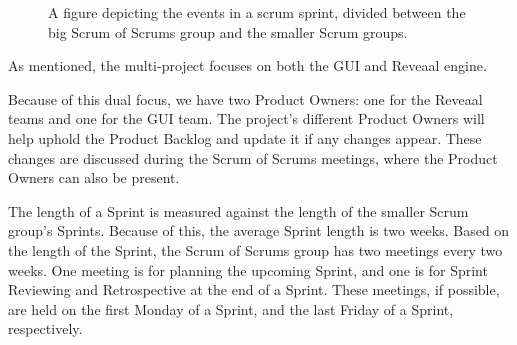 \begin{figure}[H]
    \centering
    \caption{A figure depicting the events in a scrum sprint, divided between the big Scrum of Scrums group and the smaller Scrum groups.}
    \label{fig:scrum-of-scrums-events}
\end{figure}


As mentioned, the multi-project focuses on both the GUI and Reveaal engine.

Because of this dual focus, we have two Product Owners: one for the Reveaal teams and one for the GUI team.
The project's different Product Owners will help uphold the Product Backlog and update it if any changes appear. 
These changes are discussed during the Scrum of Scrums meetings, where the Product Owners can also be present.

The length of a Sprint is measured against the length of the smaller Scrum group's Sprints.
Because of this, the average Sprint length is two weeks.
Based on the length of the Sprint, the Scrum of Scrums group has two meetings every two weeks. 
One meeting is for planning the upcoming Sprint, and one is for Sprint Reviewing and Retrospective at the end of a Sprint.
These meetings, if possible, are held on the first Monday of a Sprint, and the last Friday of a Sprint, respectively.




